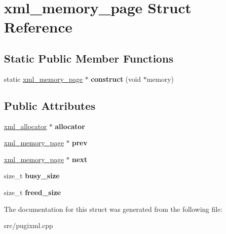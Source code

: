 \hypertarget{structxml__memory__page}{}\section{xml\+\_\+memory\+\_\+page Struct Reference}
\label{structxml__memory__page}
\subsection*{Static Public Member Functions}
\begin{DoxyCompactItemize}
\item 
\mbox{\label{structxml__memory__page_ab425973f2abb4fa98ff077d88c0df11c}} 
static \hyperlink{structxml__memory__page}{xml\+\_\+memory\+\_\+page} $\ast$ {\bfseries construct} (void $\ast$memory)
\end{DoxyCompactItemize}
\subsection*{Public Attributes}
\begin{DoxyCompactItemize}
\item 
\mbox{\label{structxml__memory__page_adf8fa143123a842baa59b82fc3d83c3b}} 
\hyperlink{structxml__allocator}{xml\+\_\+allocator} $\ast$ {\bfseries allocator}
\item 
\mbox{\label{structxml__memory__page_a014969b0e4a34a6cb24e9823791e60ab}} 
\hyperlink{structxml__memory__page}{xml\+\_\+memory\+\_\+page} $\ast$ {\bfseries prev}
\item 
\mbox{\label{structxml__memory__page_a326a74e009af80219ea31bc65ed9e45e}} 
\hyperlink{structxml__memory__page}{xml\+\_\+memory\+\_\+page} $\ast$ {\bfseries next}
\item 
\mbox{\label{structxml__memory__page_a04780ddabc14b45baba3d1ded79d355a}} 
size\+\_\+t {\bfseries busy\+\_\+size}
\item 
\mbox{\label{structxml__memory__page_ab4c29645546530a0e1938b53979890a8}} 
size\+\_\+t {\bfseries freed\+\_\+size}
\end{DoxyCompactItemize}


The documentation for this struct was generated from the following file\+:\begin{DoxyCompactItemize}
\item 
src/pugixml.\+cpp\end{DoxyCompactItemize}
